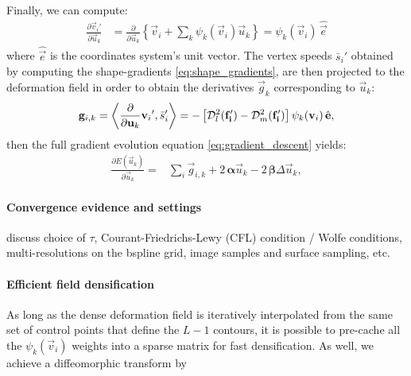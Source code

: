 Finally, we can compute:
  \begin{align}
  \frac{\partial \vec{v}_i'}{\partial \vec{u}_k} &= \frac{\partial}{\partial \vec{u}_k}
  \left\{ \vec{v}_i + \sum_k \psi_k(\vec{v}_i) \vec{u}_k \right\}
  = \psi_k(\vec{v}_i)\, \hat{\vec{e}}
  \label{eq:basis_derivative}
  \end{align}
  where $\hat{\vec{e}}$ is the coordinates system's unit vector.
The vertex speeds $\bar{s}_i'$ obtained by computing the shape-gradients \autoref{eq:shape_gradients},
	are then projected to the deformation field in order to obtain the derivatives $\vec{g}_k$
	corresponding to $\vec{u}_k$:
  \begin{equation}
  \vec{g}_{i,k} = \left\langle \frac{\partial}{\partial \vec{u}_k}{\vec{v}_i}', \bar{s}_i'\right\rangle
  = - \left[ \mdist{f_i'}{l} - \mdist{f_i'}{m} \right] \psi_k(\vec{v}_i)\, \hat{\vec{e}},
  \end{equation}
  then the full gradient evolution equation \eqref{eq:gradient_descent} yields:
  \begin{align}
  \frac{\partial E(\vec{u}_k)}{\partial \vec{u}_k} =
  &\underset{i}{\sum} \vec{g}_{i,k} +2\, \boldsymbol{\alpha} \vec{u}_k
  -2\, \boldsymbol{\beta} \Delta \vec{u}_k,
  \label{eq:gradient_final}
  \end{align}

{\color{red}
\paragraph*{Convergence evidence and settings}
 discuss choice of $\tau$, Courant-Friedrichs-Lewy (CFL) condition / Wolfe conditions, multi-resolutions on the bspline grid, image samples and surface sampling,  etc.
\paragraph*{Efficient field densification}
As long as the dense deformation field is iteratively interpolated
from the same set of control points that define the $L-1$ contours,
it is possible to pre-cache all the $\psi_k(\vec{v}_i)$ weights into a
sparse matrix for fast densification. As well, we achieve a
diffeomorphic transform by}



